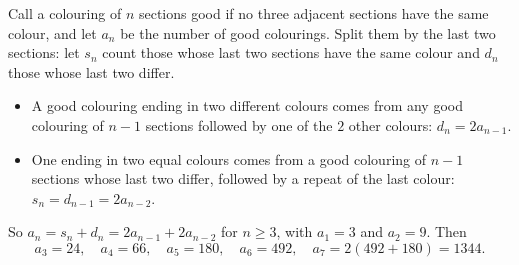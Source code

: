 Call a colouring of $n$ sections good if no three adjacent sections have the same colour, and let $a_n$ be the number of good colourings. Split them by the last two sections: let $s_n$ count those whose last two sections have the same colour and $d_n$ those whose last two differ.
\begin{itemize}
\item A good colouring ending in two different colours comes from any good colouring of $n-1$ sections followed by one of the $2$ other colours: $d_n=2a_{n-1}$.
\item One ending in two equal colours comes from a good colouring of $n-1$ sections whose last two differ, followed by a repeat of the last colour: $s_n=d_{n-1}=2a_{n-2}$.
\end{itemize}
So $a_n=s_n+d_n=2a_{n-1}+2a_{n-2}$ for $n\ge3$, with $a_1=3$ and $a_2=9$. Then
\[a_3=24,\quad a_4=66,\quad a_5=180,\quad a_6=492,\quad a_7=2(492+180)=\boxed{1344}.\]
